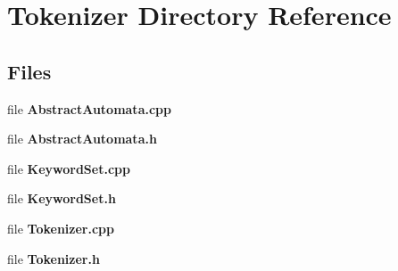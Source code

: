 \section{Tokenizer Directory Reference}
\label{dir_7fa5d81ca7c0111819bb66c3711fe32b}
\subsection*{Files}
\begin{DoxyCompactItemize}
\item 
file {\bf Abstract\-Automata.\-cpp}
\item 
file {\bf Abstract\-Automata.\-h}
\item 
file {\bf Keyword\-Set.\-cpp}
\item 
file {\bf Keyword\-Set.\-h}
\item 
file {\bf Tokenizer.\-cpp}
\item 
file {\bf Tokenizer.\-h}
\end{DoxyCompactItemize}
